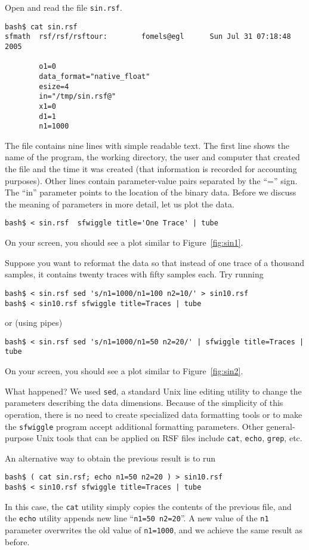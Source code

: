 Open and read the file \texttt{sin.rsf}.
\begin{verbatim}
bash$ cat sin.rsf
sfmath  rsf/rsf/rsftour:        fomels@egl      Sun Jul 31 07:18:48 2005

        o1=0
        data_format="native_float"
        esize=4
        in="/tmp/sin.rsf@"
        x1=0
        d1=1
        n1=1000
\end{verbatim}
The file contains nine lines with simple readable text. The first line
shows the name of the program, the working directory, the user and
computer that created the file and the time it was created (that
information is recorded for accounting purposes). Other lines contain
parameter-value pairs separated by the ``='' sign. The ``in''
parameter points to the location of the binary data. Before we discuss
the meaning of parameters in more detail, let us plot the data.
\begin{verbatim}
bash$ < sin.rsf  sfwiggle title='One Trace' | tube
\end{verbatim}
On your screen, you should see a plot similar to Figure~\ref{fig:sin1}.

 
Suppose you want to reformat the data so that instead of one trace of a
thousand samples, it contains twenty traces with fifty samples each. Try
running
\begin{verbatim}
bash$ < sin.rsf sed 's/n1=1000/n1=100 n2=10/' > sin10.rsf 
bash$ < sin10.rsf sfwiggle title=Traces | tube
\end{verbatim}
or (using pipes)
\begin{verbatim}
bash$ < sin.rsf sed 's/n1=1000/n1=50 n2=20/' | sfwiggle title=Traces | tube
\end{verbatim}
On your screen, you should see a plot similar to Figure~\ref{fig:sin2}.


What happened? We used \texttt{sed}, a standard Unix line editing utility to
change the parameters describing the data dimensions. Because of the
simplicity of this operation, there is no need to create specialized data
formatting tools or to make the \texttt{sfwiggle} program accept additional
formatting parameters. Other general-purpose Unix tools that can be applied on
RSF files include \texttt{cat}, \texttt{echo}, \texttt{grep}, etc. 

An alternative way to obtain the previous result is to run
\begin{verbatim}
bash$ ( cat sin.rsf; echo n1=50 n2=20 ) > sin10.rsf 
bash$ < sin10.rsf sfwiggle title=Traces | tube
\end{verbatim}
In this case, the \texttt{cat} utility simply copies the contents of the
previous file, and the \texttt{echo} utility appends new line ``\texttt{n1=50
  n2=20}''. A new value of the \texttt{n1} parameter overwrites the old value
of \texttt{n1=1000}, and we achieve the same result as before.

